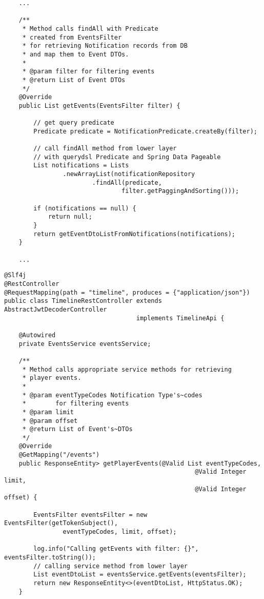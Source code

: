 \documentclass[12pt]{article}
\begin{document}
{\begin{lstlisting}
    ...
    
    /**
     * Method calls findAll with Predicate
     * created from EventsFilter
     * for retrieving Notification records from DB
     * and map them to Event DTOs.
     *
     * @param filter for filtering events
     * @return List of Event DTOs
     */
    @Override
    public List getEvents(EventsFilter filter) {

        // get query predicate
        Predicate predicate = NotificationPredicate.createBy(filter);

        // call findAll method from lower layer
        // with querydsl Predicate and Spring Data Pageable
        List notifications = Lists
                .newArrayList(notificationRepository
                        .findAll(predicate,
                                filter.getPaggingAndSorting()));

        if (notifications == null) {
            return null;
        }
        return getEventDtoListFromNotifications(notifications);
    }
    
    ...

\end{lstlisting}


\clearpage


\begin{lstlisting}
@Slf4j
@RestController
@RequestMapping(path = "timeline", produces = {"application/json"})
public class TimelineRestController extends AbstractJwtDecoderController
                                    implements TimelineApi {

    @Autowired
    private EventsService eventsService;

    /**
     * Method calls appropriate service methods for retrieving
     * player events.
     *
     * @param eventTypeCodes Notification Type's~codes
     *        for filtering events
     * @param limit
     * @param offset
     * @return List of Event's~DTOs
     */
    @Override
    @GetMapping("/events")
    public ResponseEntity> getPlayerEvents(@Valid List eventTypeCodes,
                                                    @Valid Integer limit,
                                                    @Valid Integer offset) {

        EventsFilter eventsFilter = new EventsFilter(getTokenSubject(),
                eventTypeCodes, limit, offset);

        log.info("Calling getEvents with filter: {}", eventsFilter.toString());
        // calling service method from lower layer
        List eventDtoList = eventsService.getEvents(eventsFilter);
        return new ResponseEntity<>(eventDtoList, HttpStatus.OK);
    }
    

\end{lstlisting}}
\end{document}
